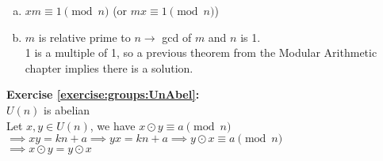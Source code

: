 \begin{enumerate}[(a)]
\item
$xm\equiv 1 \pmod{n}$ (or $mx\equiv 1 \pmod{n}$)

\item 
$m$ is relative prime to $n\to$ gcd of $m$ and $n$ is 1.\\
1 is a multiple of 1, so a previous theorem from the Modular Arithmetic chapter implies  there is a solution.
\end{enumerate}

\noindent\textbf{Exercise \ref{exercise:groups:UnAbel}:}
\\
$U(n)$ is abelian\\
Let $x, y \in U(n)$, we have $x \odot y \equiv a \pmod{n}$\\
$\implies xy=kn + a \implies yx = kn + a \implies y \odot x \equiv a \pmod{n}$\\
$\implies x \odot y = y \odot x$
\\


